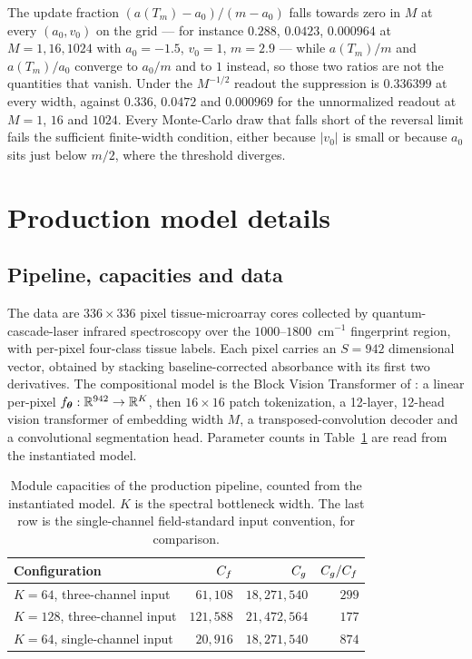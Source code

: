 The update fraction $(a(T_m) - a_0)/(m - a_0)$ falls towards zero in $M$ at
every $(a_0, v_0)$ on the grid --- for instance $0.288$, $0.0423$, $0.000964$
at $M = 1, 16, 1024$ with $a_0 = -1.5$, $v_0 = 1$, $m = 2.9$ --- while
$a(T_m)/m$ and $a(T_m)/a_0$ converge to $a_0/m$ and to $1$ instead, so those
two ratios are not the quantities that vanish. Under the $M^{-1/2}$ readout
the suppression is $0.336399$ at every width, against $0.336$, $0.0472$ and
$0.000969$ for the unnormalized readout at $M = 1$, $16$ and $1024$. Every
Monte-Carlo draw that falls short of the reversal limit fails the sufficient
finite-width condition, either because $|v_0|$ is small or because $a_0$ sits
just below $m/2$, where the threshold diverges.


\section{Production model details}
\label{app:production}

\subsection{Pipeline, capacities and data}
\label{app:prod_setup}

The data are $336 \times 336$ pixel tissue-microarray cores collected by
quantum-cascade-laser infrared spectroscopy over the $1000$--$1800$~cm$^{-1}$
fingerprint region, with per-pixel four-class tissue labels. Each pixel carries
an $S = 942$ dimensional vector, obtained by stacking baseline-corrected
absorbance with its first two derivatives. The compositional model is the Block
Vision Transformer of \citet{oleary2026spatial}: a linear per-pixel
$f_{\boldsymbol{\theta}} : \mathbb{R}^{942} \to \mathbb{R}^{K}$, then $16 \times 16$ patch tokenization, a
12-layer, 12-head vision transformer of embedding width $M$, a
transposed-convolution decoder and a convolutional segmentation head. Parameter
counts in Table~\ref{tab:app_capacity} are read from the instantiated model.

\begin{table}[htbp]
\centering
\caption{Module capacities of the production pipeline, counted from the
instantiated model. $K$ is the spectral bottleneck width. The last row is the
single-channel field-standard input convention, for comparison.}
\label{tab:app_capacity}
\begin{tabular}{lrrr}
\toprule
Configuration & $C_f$ & $C_g$ & $C_g/C_f$ \\
\midrule
$K = 64$, three-channel input  & $61{,}108$  & $18{,}271{,}540$ & $299$ \\
$K = 128$, three-channel input & $121{,}588$ & $21{,}472{,}564$ & $177$ \\
$K = 64$, single-channel input & $20{,}916$  & $18{,}271{,}540$ & $874$ \\
\bottomrule
\end{tabular}
\end{table}

